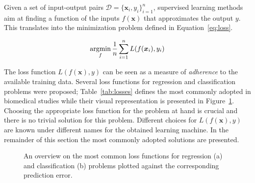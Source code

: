 	  Given a set of input-output pairs $\mathcal{D} = \{\bm{x}_i, y_i\}_{i=1}^n$, supervised learning methods aim at finding a function of the inputs $f(\bm{x})$ that approximates the output $y$. This translates into the minimization problem defined in Equation~\eqref{eq:loss}.

	  \begin{equation}\label{eq:loss}
	    \argmin_f \frac{1}{n}\sum_{i=1}^n L(f(\bm{x}_i),y_i) %
	  \end{equation}

	  The loss function $L(f(\bm{x}),y)$ can be seen as a measure of \textit{adherence} to the available training data. Several loss functions for regression and classification problems were proposed; Table~\ref{tab:losses} defines the most commonly adopted in biomedical studies while their visual representation is presented in Figure~\ref{fig:loss}.
		Choosing the appropriate loss function for the problem at hand is crucial and there is no trivial solution for this problem.
		Different choices for $L(f(\bm{x}),y)$ are known under different names for the obtained learning machine. In the remainder of this section the most commonly adopted solutions are presented.

	  \begin{figure}[!h]
	  	\centering
	  	\caption{An overview on the most common loss functions for regression (a) and classification (b) problems plotted against the corresponding prediction error.}\label{fig:loss}
	  \end{figure}



